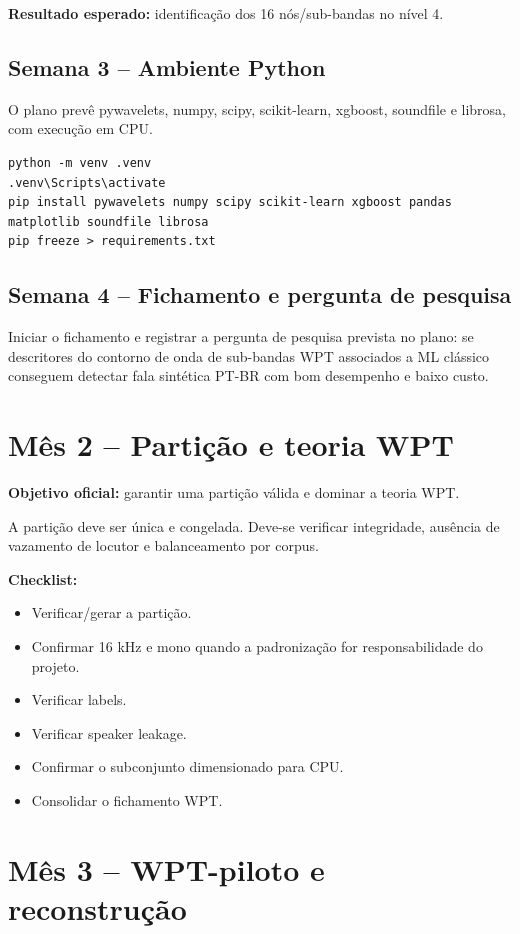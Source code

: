 \documentclass[12pt,a4paper]{article}
\begin{document}
\textbf{Resultado esperado:} identificação dos 16 nós/sub-bandas no nível 4.

\subsection{Semana 3 -- Ambiente Python}

O plano prevê pywavelets, numpy, scipy, scikit-learn, xgboost, soundfile e librosa, com execução em CPU.

\begin{lstlisting}
python -m venv .venv
.venv\Scripts\activate
pip install pywavelets numpy scipy scikit-learn xgboost pandas matplotlib soundfile librosa
pip freeze > requirements.txt
\end{lstlisting}

\subsection{Semana 4 -- Fichamento e pergunta de pesquisa}

Iniciar o fichamento e registrar a pergunta de pesquisa prevista no plano: se descritores do contorno de onda de sub-bandas WPT associados a ML clássico conseguem detectar fala sintética PT-BR com bom desempenho e baixo custo.

\section{Mês 2 -- Partição e teoria WPT}

\textbf{Objetivo oficial:} garantir uma partição válida e dominar a teoria WPT.

A partição deve ser única e congelada. Deve-se verificar integridade, ausência de vazamento de locutor e balanceamento por corpus.

\textbf{Checklist:}
\begin{itemize}[label=$\square$]
\item Verificar/gerar a partição.
\item Confirmar 16 kHz e mono quando a padronização for responsabilidade do projeto.
\item Verificar labels.
\item Verificar speaker leakage.
\item Confirmar o subconjunto dimensionado para CPU.
\item Consolidar o fichamento WPT.
\end{itemize}

\section{Mês 3 -- WPT-piloto e reconstrução}
\end{document}
